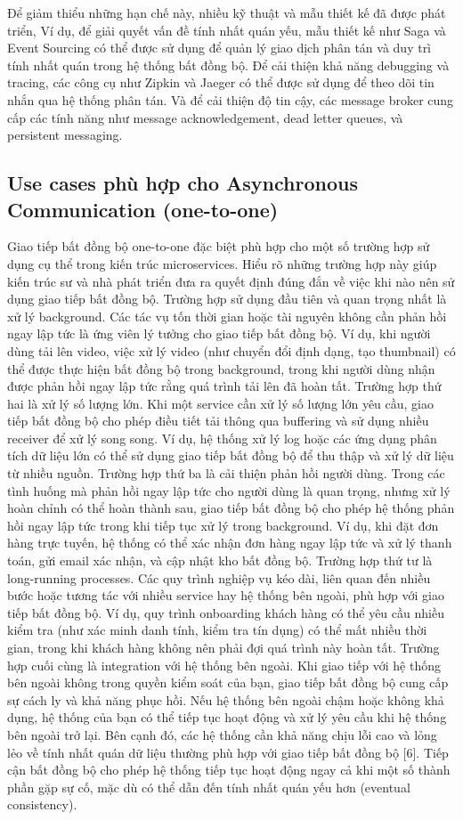 Để giảm thiểu những hạn chế này, nhiều kỹ thuật và mẫu thiết kế đã được phát triển, Ví dụ, để giải quyết vấn đề tính nhất quán yếu, mẫu thiết kế như Saga và Event Sourcing có thể được sử dụng để quản lý giao dịch phân tán và duy trì tính nhất quán trong hệ thống bất đồng bộ. Để cải thiện khả năng debugging và tracing, các công cụ như Zipkin và Jaeger có thể được sử dụng để theo dõi tin nhắn qua hệ thống phân tán. Và để cải thiện độ tin cậy, các message broker cung cấp các tính năng như message acknowledgement, dead letter queues, và persistent messaging.

\subsection{Use cases phù hợp cho Asynchronous Communication (one-to-one)}
Giao tiếp bất đồng bộ one-to-one đặc biệt phù hợp cho một số trường hợp sử dụng cụ thể trong kiến trúc microservices. Hiểu rõ những trường hợp này giúp kiến trúc sư và nhà phát triển đưa ra quyết định đúng đắn về việc khi nào nên sử dụng giao tiếp bất đồng bộ.
Trường hợp sử dụng đầu tiên và quan trọng nhất là xử lý background. Các tác vụ tốn thời gian hoặc tài nguyên không cần phản hồi ngay lập tức là ứng viên lý tưởng cho giao tiếp bất đồng bộ. Ví dụ, khi người dùng tải lên video, việc xử lý video (như chuyển đổi định dạng, tạo thumbnail) có thể được thực hiện bất đồng bộ trong background, trong khi người dùng nhận được phản hồi ngay lập tức rằng quá trình tải lên đã hoàn tất.
Trường hợp thứ hai là xử lý số lượng lớn. Khi một service cần xử lý số lượng lớn yêu cầu, giao tiếp bất đồng bộ cho phép điều tiết tải thông qua buffering và sử dụng nhiều receiver để xử lý song song. Ví dụ, hệ thống xử lý log hoặc các ứng dụng phân tích dữ liệu lớn có thể sử dụng giao tiếp bất đồng bộ để thu thập và xử lý dữ liệu từ nhiều nguồn.
Trường hợp thứ ba là cải thiện phản hồi người dùng. Trong các tình huống mà phản hồi ngay lập tức cho người dùng là quan trọng, nhưng xử lý hoàn chỉnh có thể hoàn thành sau, giao tiếp bất đồng bộ cho phép hệ thống phản hồi ngay lập tức trong khi tiếp tục xử lý trong background. Ví dụ, khi đặt đơn hàng trực tuyến, hệ thống có thể xác nhận đơn hàng ngay lập tức và xử lý thanh toán, gửi email xác nhận, và cập nhật kho bất đồng bộ.
Trường hợp thứ tư là long-running processes. Các quy trình nghiệp vụ kéo dài, liên quan đến nhiều bước hoặc tương tác với nhiều service hay hệ thống bên ngoài, phù hợp với giao tiếp bất đồng bộ. Ví dụ, quy trình onboarding khách hàng có thể yêu cầu nhiều kiểm tra (như xác minh danh tính, kiểm tra tín dụng) có thể mất nhiều thời gian, trong khi khách hàng không nên phải đợi quá trình này hoàn tất.
Trường hợp cuối cùng là integration với hệ thống bên ngoài. Khi giao tiếp với hệ thống bên ngoài không trong quyền kiểm soát của bạn, giao tiếp bất đồng bộ cung cấp sự cách ly và khả năng phục hồi. Nếu hệ thống bên ngoài chậm hoặc không khả dụng, hệ thống của bạn có thể tiếp tục hoạt động và xử lý yêu cầu khi hệ thống bên ngoài trở lại.
Bên cạnh đó, các hệ thống cần khả năng chịu lỗi cao và lỏng lẻo về tính nhất quán dữ liệu thường phù hợp với giao tiếp bất đồng bộ [6]. Tiếp cận bất đồng bộ cho phép hệ thống tiếp tục hoạt động ngay cả khi một số thành phần gặp sự cố, mặc dù có thể dẫn đến tính nhất quán yếu hơn (eventual consistency).

